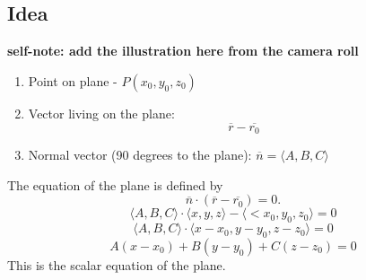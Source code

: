 \documentclass{article}
\begin{document}
\subsection*{Idea}
\begin{illustrationbox}
\textbf{self-note: add the illustration here from the camera roll}
\end{illustrationbox}
\begin{notebox}
\begin{enumerate}
    \item Point on plane - \( P(x_0, y_0, z_0) \)
    \item Vector living on the plane:
    \[
        \overline{r} - \overline{r_0}
    \]
    \item Normal vector (90 degrees to the plane): \( \overline{n} = \langle A, B, C \rangle \)
\end{enumerate}
\end{notebox}

\begin{definitionbox}
The equation of the plane is defined by
\[
    \overline{n} \cdot (\overline{r} - \overline{r_0}) = 0.
\]
\[
    \langle A, B, C \rangle \cdot \langle x, y, z \rangle - \langle <x_0, y_0, z_0 \rangle = 0
\]
\[
    \langle A, B, C \rangle \cdot \langle x - x_0, y - y_0, z - z_0 \rangle = 0
\]
\[
    A(x - x_0) + B(y - y_0) + C(z - z_0) = 0
\]
This is the scalar equation of the plane.
\end{definitionbox}
\end{document}
